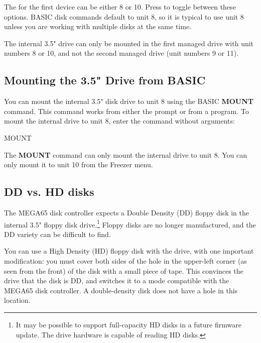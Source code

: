 The  for the first device can be either 8 or 10. Press  to toggle between these options. BASIC disk commands default to unit 8, so it is typical to use unit 8 unless you are working with multiple disks at the same time.

The internal 3.5" drive can only be mounted in the first managed drive with unit numbers 8 or 10, and not the second managed drive (unit numbers 9 or 11).

\subsection{Mounting the 3.5" Drive from BASIC}

You can mount the internal 3.5" disk drive to unit 8 using the BASIC {\bf MOUNT} command. This command works from either the  prompt or from a program. To mount the internal drive to unit 8, enter the command without arguments:

\begin{screenoutput}
MOUNT
\end{screenoutput}

The {\bf MOUNT} command can only mount the internal drive to unit 8. You can only mount it to unit 10 from the Freezer menu.

\subsection{DD vs. HD disks}

The MEGA65 disk controller expects a Double Density (DD) floppy disk in the internal 3.5" floppy disk drive.\footnote{It may be possible to support full-capacity HD disks in a future firmware update. The drive hardware is capable of reading HD disks.} Floppy disks are no longer manufactured, and the DD variety can be difficult to find.

You can use a High Density (HD) floppy disk with the drive, with one important modification: you must cover both sides of the hole in the upper-left corner (as seen from the front) of the disk with a small piece of tape. This convinces the drive that the disk is DD, and switches it to a mode compatible with the MEGA65 disk controller. A double-density disk does not have a hole in this location.

